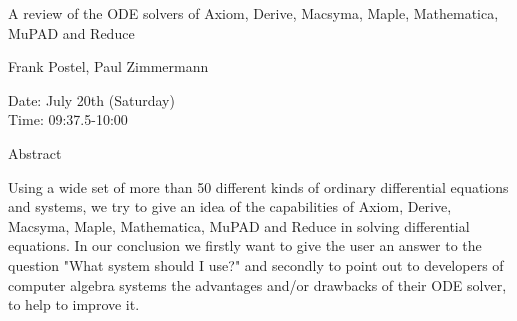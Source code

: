 \begin{center}
\LARGE
A review of the ODE solvers of Axiom, Derive, Macsyma,
          Maple, Mathematica, MuPAD and Reduce
\end{center}

\begin{center}
\Large
Frank Postel, Paul Zimmermann
\end{center}

\noindent
Date:  July 20th (Saturday)\\
Time:  09:37.5-10:00\\

\begin{center}
\large
Abstract
\end{center}

Using a wide set of more than 50 different kinds of ordinary differential equations and systems,
we try to give an idea of the capabilities of Axiom, Derive, Macsyma, Maple, Mathematica,
MuPAD and Reduce in solving differential equations. In our conclusion we firstly want to give the
user an answer to the question "What system should I use?" and secondly to point out to developers
of computer algebra systems the advantages and/or drawbacks of their ODE solver, to help to
improve it. 

